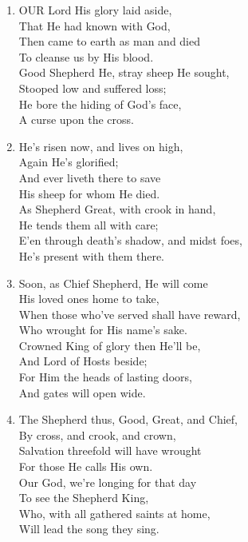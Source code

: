 \begin{enumerate}
    \item OUR Lord His glory laid aside, \\
            That He had known with God, \\
        Then came to earth as man and died \\
            To cleanse us by His blood. \\
        Good Shepherd He, stray sheep He sought, \\
            Stooped low and suffered loss; \\
        He bore the hiding of God's face, \\
            A curse upon the cross.

    \item He's risen now, and lives on high, \\
            Again He's glorified; \\
        And ever liveth there to save \\
            His sheep for whom He died. \\
        As Shepherd Great, with crook in hand, \\
            He tends them all with care; \\
        E'en through death's shadow, and midst foes, \\
            He's present with them there.

    \item Soon, as Chief Shepherd, He will come \\
            His loved ones home to take, \\
        When those who've served shall have reward, \\
            Who wrought for His name's sake. \\
        Crowned King of glory then He'll be, \\
            And Lord of Hosts beside; \\
        For Him the heads of lasting doors, \\
            And gates will open wide.

    \item The Shepherd thus, Good, Great, and Chief, \\
            By cross, and crook, and crown, \\
        Salvation threefold will have wrought \\
            For those He calls His own. \\
        Our God, we're longing for that day \\
            To see the Shepherd King, \\
        Who, with all gathered saints at home, \\
            Will lead the song they sing.

\end{enumerate}

